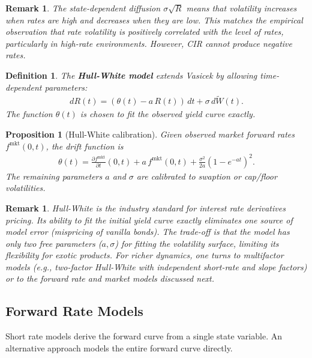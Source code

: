 \documentclass{report}
\theoremstyle{spacedplain}
\newtheorem{proposition}[theorem]{Proposition}
\theoremstyle{spaceddefinition}
\newtheorem{definition}[theorem]{Definition}
\theoremstyle{spacedremark}
\newtheorem{remark}[theorem]{Remark}
\begin{document}
\begin{remark}
The state-dependent diffusion $\sigma\sqrt{R}$ means that volatility increases when rates are high and decreases when they are low. This matches the empirical observation that rate volatility is positively correlated with the level of rates, particularly in high-rate environments. However, CIR cannot produce negative rates.
\end{remark}

\begin{definition}
The \textbf{Hull-White model} extends Vasicek by allowing time-dependent parameters:
\begin{align}
    dR(t) = (\theta(t) - a\,R(t))\,dt + \sigma\,d\widetilde{W}(t).
\end{align}
The function $\theta(t)$ is chosen to fit the observed yield curve exactly.
\end{definition}

\begin{proposition}[Hull-White calibration]
Given observed market forward rates $f^{\text{mkt}}(0,t)$, the drift function is
\begin{align}
    \theta(t) = \frac{\partial f^{\text{mkt}}}{\partial t}(0,t) + a\,f^{\text{mkt}}(0,t) + \frac{\sigma^2}{2a}(1 - e^{-at})^2.
\end{align}
The remaining parameters $a$ and $\sigma$ are calibrated to swaption or cap/floor volatilities.
\end{proposition}

\begin{remark}
Hull-White is the industry standard for interest rate derivatives pricing. Its ability to fit the initial yield curve exactly eliminates one source of model error (mispricing of vanilla bonds). The trade-off is that the model has only two free parameters ($a, \sigma$) for fitting the volatility surface, limiting its flexibility for exotic products. For richer dynamics, one turns to multifactor models (e.g., two-factor Hull-White with independent short-rate and slope factors) or to the forward rate and market models discussed next.
\end{remark}


\subsection{Forward Rate Models}

Short rate models derive the forward curve from a single state variable. An alternative approach models the entire forward curve directly.
\end{document}
